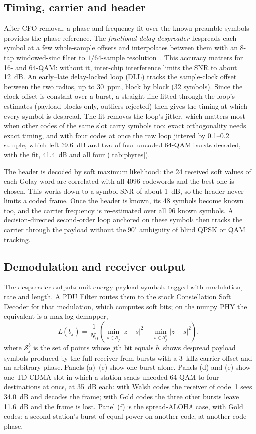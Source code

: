 \documentclass[11pt,a4paper,oneside]{report}
\begin{document}
\subsection{Timing, carrier and header}
After CFO removal, a phase and frequency fit over the known preamble symbols provides the phase
reference. The \emph{fractional-delay despreader} despreads each symbol at a few whole-sample offsets
and interpolates between them with an 8-tap windowed-sinc filter to $1/64$-sample
resolution~\cite{gardner1993}. This accuracy matters for 16- and 64-QAM: without it, inter-chip
interference limits the SNR to about \SI{12}{dB}. An early--late delay-locked loop (DLL) tracks the
sample-clock offset between the two radios, up to \SI{30}{ppm}, block by block (32 symbols). Since the
clock offset is constant over a burst, a straight line fitted through the loop's estimates (payload
blocks only, outliers rejected) then gives the timing at which every symbol is despread. The fit
removes the loop's jitter, which matters most when other codes of the same slot carry symbols too:
exact orthogonality needs exact timing, and with four codes at once the raw loop jittered by 0.1--0.2
sample, which left \SI{39.6}{dB} and two of four uncoded 64-QAM bursts decoded; with the fit,
\SI{41.4}{dB} and all four (\cref{tab:phyres}).

The header is decoded by soft maximum likelihood: the 24 received soft values of each Golay word
are correlated with all \num{4096} codewords and the best one is chosen. This works down to a symbol
SNR of about \SI{1}{dB}, so the header never limits a coded frame. Once the header is known, its 48
symbols become known too, and the carrier frequency is re-estimated over all 96 known symbols. A
decision-directed second-order loop anchored on these symbols then tracks the carrier through the
payload without the $90^\circ$ ambiguity of blind QPSK or QAM tracking.

\subsection{Demodulation and receiver output}
The despreader outputs unit-energy payload symbols tagged with modulation, rate and length. A PDU
Filter routes them to the stock Constellation Soft Decoder for that modulation, which computes soft
bits; on the numpy PHY the equivalent is a max-log demapper,
\begin{equation}
  L(b_j)=\frac{1}{N_0}\left(\min_{s\in\mathcal{S}_j^{1}}|z-s|^2-\min_{s\in\mathcal{S}_j^{0}}|z-s|^2\right),
\end{equation}
where $\mathcal{S}_j^{b}$ is the set of points whose $j$th bit equals $b$.  shows
despread payload symbols produced by the full receiver from bursts with a \SI{3}{kHz} carrier offset and
an arbitrary phase. Panels (a)--(c) show one burst alone. Panels (d) and (e) show one TD-CDMA slot in
which a station sends uncoded 64-QAM to four destinations at once, at \SI{35}{dB} each: with Walsh codes
the receiver of code~1 sees \SI{34.0}{dB} and decodes the frame; with Gold codes the three other bursts
leave \SI{11.6}{dB} and the frame is lost. Panel (f) is the spread-ALOHA case, with Gold codes: a second
station's burst of equal power on another code, at another code phase.
\end{document}
